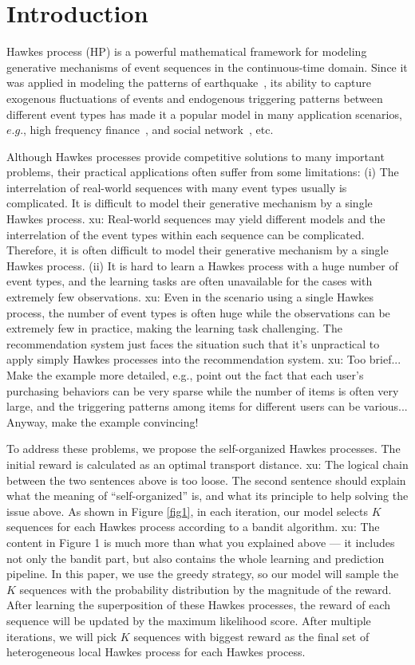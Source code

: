 \documentclass[runningheads]{llncs}
\newcommand{\xu}[1]{{\color{red} xu: #1}}
\begin{document}
\section{Introduction}
Hawkes process (HP) is a powerful mathematical framework for modeling generative mechanisms of event sequences in the continuous-time domain. 
Since it was applied in modeling the patterns of earthquake~\cite{ogata1988statistical}, its ability to capture exogenous fluctuations of events and endogenous triggering patterns between different event types has made it a popular model in many application scenarios, $e.g.$, high frequency finance~\cite{bacry2015hawkes}, and social network~\cite{farajtabar2015back}, etc.


Although Hawkes processes provide competitive solutions to many important problems, their practical applications often suffer from some limitations: 
(i) The interrelation of real-world sequences with many event types usually is complicated. 
It is difficult to model their generative mechanism by a single Hawkes process.
\xu{Real-world sequences may yield different models and the interrelation of the event types within each sequence can be complicated. 
Therefore, it is often difficult to model their generative mechanism by a single Hawkes process.}
(ii) It is hard to learn a Hawkes process with a huge number of event types, and the learning tasks are often unavailable for the cases with extremely few observations. 
\xu{Even in the scenario using a single Hawkes process, the number of event types is often huge while the observations can be extremely few in practice, making the learning task challenging.}
The recommendation system just faces the situation such that it's unpractical to apply simply Hawkes processes into the recommendation system.\xu{Too brief... Make the example more detailed, e.g., point out the fact that each user's purchasing behaviors can be very sparse while the number of items is often very large, and the triggering patterns among items for different users can be various... Anyway, make the example convincing!} 



To address these problems, we propose the self-organized Hawkes processes.
The initial reward is calculated as an optimal transport distance.
\xu{The logical chain between the two sentences above is too loose. The second sentence should explain what the meaning of ``self-organized'' is, and what its principle to help solving the issue above.}
As shown in Figure \ref{fig1}, in each iteration, our model selects $K$ sequences for each Hawkes process according to a bandit algorithm. 
\xu{The content in Figure 1 is much more than what you explained above --- it includes not only the bandit part, but also contains the whole learning and prediction pipeline.}
In this paper, we use the greedy strategy, so our model will sample the $K$ sequences with the probability distribution by the magnitude of the reward.
After learning the superposition of these Hawkes processes, the reward of each sequence will be updated by the maximum likelihood score. 
After multiple iterations, we will pick $K$ sequences with biggest reward as the final set of heterogeneous local Hawkes process for each Hawkes process.
\end{document}

